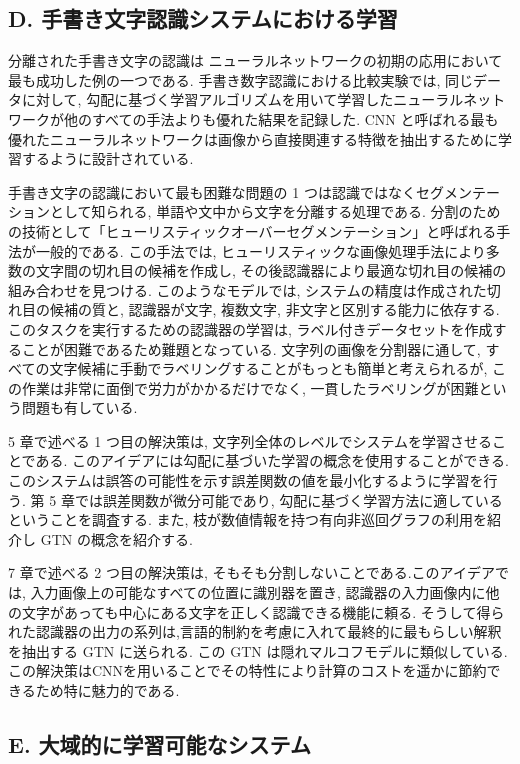 \documentclass[twocolumn]{jarticle}     %
\begin{document}
\subsection*{D. 手書き文字認識システムにおける学習}
分離された手書き文字の認識は 
ニューラルネットワークの初期の応用において最も成功した例の一つである. 手書き数字認識における比較実験では, 同じデータに対して, 勾配に基づく学習アルゴリズムを用いて学習したニューラルネットワークが他のすべての手法よりも優れた結果を記録した. CNN と呼ばれる最も優れたニューラルネットワークは画像から直接関連する特徴を抽出するために学習するように設計されている.\par
手書き文字の認識において最も困難な問題の 1 つは認識ではなくセグメンテーションとして知られる, 単語や文中から文字を分離する処理である.
分割のための技術として「ヒューリスティックオーバーセグメンテーション」と呼ばれる手法が一般的である.
この手法では, ヒューリスティックな画像処理手法により多数の文字間の切れ目の候補を作成し, その後認識器により最適な切れ目の候補の組み合わせを見つける. このようなモデルでは, システムの精度は作成された切れ目の候補の質と, 認識器が文字, 複数文字, 非文字と区別する能力に依存する.  このタスクを実行するための認識器の学習は, ラベル付きデータセットを作成することが困難であるため難題となっている.
文字列の画像を分割器に通して, すべての文字候補に手動でラベリングすることがもっとも簡単と考えられるが, この作業は非常に面倒で労力がかかるだけでなく, 一貫したラベリングが困難という問題も有している.
\par
5 章で述べる 1 つ目の解決策は, 文字列全体のレベルでシステムを学習させることである. このアイデアには勾配に基づいた学習の概念を使用することができる. このシステムは誤答の可能性を示す誤差関数の値を最小化するように学習を行う. 第 5 章では誤差関数が微分可能であり, 勾配に基づく学習方法に適しているということを調査する.
また, 枝が数値情報を持つ有向非巡回グラフの利用を紹介し GTN の概念を紹介する.
\par
7 章で述べる 2 つ目の解決策は, そもそも分割しないことである.このアイデアでは, 入力画像上の可能なすべての位置に識別器を置き, 認識器の入力画像内に他の文字があっても中心にある文字を正しく認識できる機能に頼る.
そうして得られた認識器の出力の系列は,言語的制約を考慮に入れて最終的に最もらしい解釈を抽出する GTN に送られる. この GTN は隠れマルコフモデルに類似している.  この解決策はCNNを用いることでその特性により計算のコストを遥かに節約できるため特に魅力的である.

\subsection*{E. 大域的に学習可能なシステム}
\end{document}
